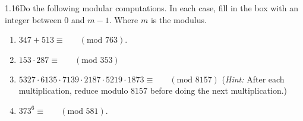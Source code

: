 \begin{exercise}
    {1.16}Do the following modular computations. In each case, fill in the box with an integer between 0 and \(m - 1\). Where \(m\) is the modulus.
    \begin{enumerate}
        \item \(347 + 513 \equiv \boxed{\phantom{000}} \ (\text{mod } 763)\).
              \setcounter{enumi}{2}
        \item \(153 \cdot 287 \equiv \boxed{\phantom{000}} \ (\text{mod } 353)\)
              \setcounter{enumi}{4}
        \item \(5327 \cdot 6135 \cdot 7139 \cdot 2187 \cdot 5219 \cdot 1873 \equiv \boxed{\phantom{000}} \ (\text{mod } 8157)\) (\textit{Hint:} After each multiplication, reduce modulo \(8157\) before doing the next multiplication.)
              \setcounter{enumi}{6}
        \item \(373^6 \equiv \boxed{\phantom{000}} \ (\text{mod } 581)\).
    \end{enumerate}
\end{exercise}


